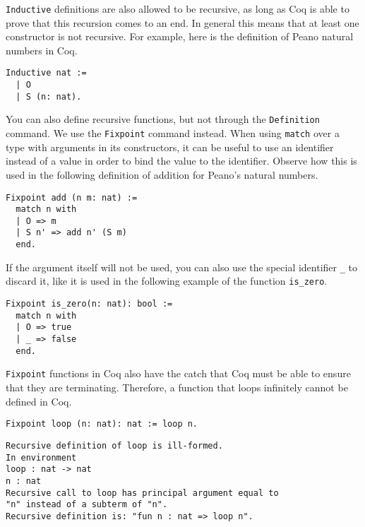 \texttt{Inductive} definitions are also allowed to be recursive, as long as Coq is able to 
prove that this recursion comes to an end. In general this means that at least one constructor is not 
recursive. For example, here is the definition of Peano natural numbers in Coq.

\begin{verbatim}
Inductive nat :=
  | O 
  | S (n: nat).
\end{verbatim}

You can also define recursive functions, but not through the \texttt{Definition} command. We 
use the \texttt{Fixpoint} command instead. When using \texttt{match} over a type 
with arguments in its constructors, it can be useful to use an identifier instead of a value in order 
to bind the value to the identifier. Observe how this is used in the following definition of addition
for Peano's natural numbers.

\begin{verbatim}
Fixpoint add (n m: nat) :=
  match n with
  | O => m
  | S n' => add n' (S m)
  end.
\end{verbatim}

If the argument itself will not be used, you can also use the special
identifier \texttt{_} to discard it, like it is used in the following example 
of the function \texttt{is_zero}.

\begin{verbatim}
Fixpoint is_zero(n: nat): bool :=
  match n with
  | O => true
  | _ => false
  end.
\end{verbatim}


\texttt{Fixpoint} functions in Coq also have the catch that Coq must be able to ensure that
they are terminating. Therefore, a function that loops infinitely cannot be defined in Coq. 

\begin{verbatim}
Fixpoint loop (n: nat): nat := loop n.
\end{verbatim}
\vspace{-\baselineskip*3/2}
\begin{verbatim}
Recursive definition of loop is ill-formed.
In environment
loop : nat -> nat
n : nat
Recursive call to loop has principal argument equal to 
"n" instead of a subterm of "n".
Recursive definition is: "fun n : nat => loop n".
\end{verbatim}

